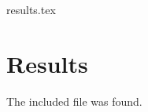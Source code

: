 \begin{filecontents*}{results.tex}
\section{Results}
The included file was found.
\end{filecontents*}
\documentclass{article}



